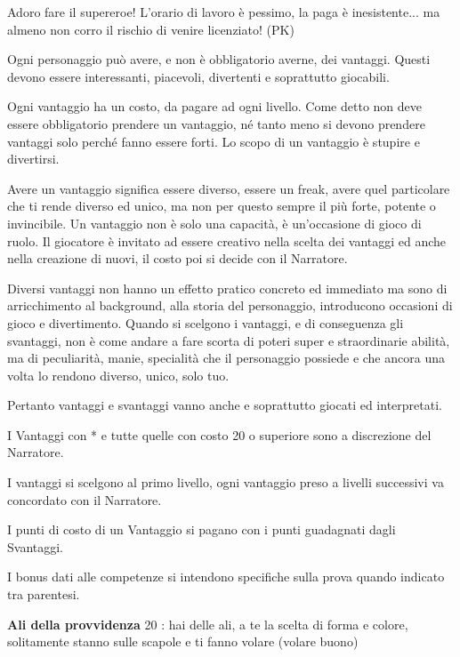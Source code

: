 \documentclass[a4paper,11pt,twoside,openany]{book}
\begin{document}
\label{vantaggi}
\begin{tcolorbox}[enhanced,arc=5pt,boxrule=0.3pt]{Adoro fare il supereroe! L'orario di lavoro è pessimo, la paga è inesistente... ma almeno non corro il rischio di venire licenziato! (PK)
	}\end{tcolorbox}\medskip

\bigskip

Ogni personaggio può avere, e non è obbligatorio averne, dei vantaggi. Questi devono essere interessanti, piacevoli, divertenti e soprattutto giocabili.

Ogni vantaggio ha un costo, da pagare ad ogni livello. Come detto non deve essere obbligatorio prendere un vantaggio, né tanto meno si devono prendere vantaggi solo perché fanno essere forti. Lo scopo di un vantaggio è stupire e divertirsi.

Avere un vantaggio significa essere diverso, essere un freak, avere quel particolare che ti rende diverso ed unico, ma non per questo sempre il più forte, potente o invincibile. Un vantaggio non è solo una capacità, è un'occasione di gioco di ruolo. Il giocatore è invitato ad essere creativo nella scelta dei vantaggi ed anche nella creazione di nuovi, il costo poi si decide con il Narratore.

Diversi vantaggi non hanno un effetto pratico concreto ed immediato ma sono di arricchimento al background, alla storia del personaggio, introducono occasioni di gioco e divertimento. Quando si scelgono i vantaggi, e di conseguenza gli svantaggi, non è come andare a fare scorta di poteri super e straordinarie abilità, ma di peculiarità, manie, specialità che il personaggio possiede e che ancora una volta lo rendono diverso, unico, solo tuo.

Pertanto vantaggi e svantaggi vanno anche e soprattutto giocati ed interpretati.

I Vantaggi con {*} e tutte quelle con costo 20 o superiore sono a discrezione del Narratore.

I vantaggi si scelgono al primo livello, ogni vantaggio preso a livelli successivi va concordato con il Narratore.

I punti di costo di un Vantaggio si pagano con i punti guadagnati dagli Svantaggi.

I bonus dati alle competenze si intendono specifiche sulla prova quando indicato tra parentesi.

\bigskip

\textbf{Ali della provvidenza} 20 : hai delle ali, a te la scelta di forma e colore, solitamente stanno sulle scapole e ti fanno volare (volare buono)
\end{document}
